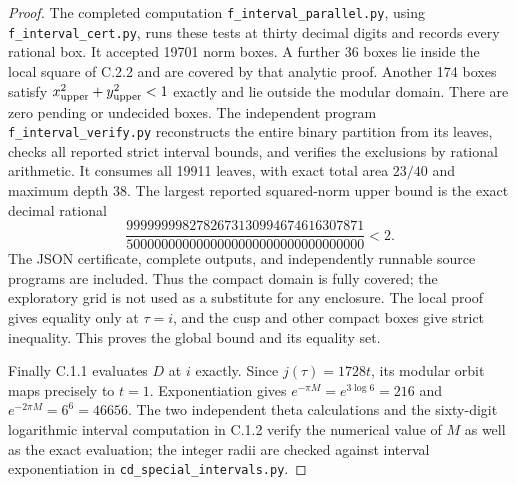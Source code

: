 \begin{proof}
The completed computation \texttt{f\_interval\_parallel.py}, using
\texttt{f\_interval\_cert.py}, runs these tests at thirty decimal digits
and records every rational box. It accepted 19701 norm boxes. A further
36 boxes lie inside the local square of C.2.2 and are covered by that
analytic proof. Another 174 boxes satisfy
$x_{\rm upper}^2+y_{\rm upper}^2<1$ exactly and lie outside the modular
domain. There are zero pending or undecided boxes. The independent
program \texttt{f\_interval\_verify.py} reconstructs the entire binary
partition from its leaves, checks all reported strict interval bounds,
and verifies the exclusions by rational arithmetic. It consumes all
19911 leaves, with exact total area $23/40$ and maximum depth 38.
The largest reported squared-norm upper bound is the exact decimal
rational
\[
 \frac{9999999982782673130994674616307871}
 {5000000000000000000000000000000000}<2.
\]
The JSON certificate, complete outputs, and independently runnable
source programs are included. Thus the compact domain is fully covered;
the exploratory grid is not used as a substitute for any enclosure.
The local proof gives equality only at $\tau=i$, and the cusp and other
compact boxes give strict inequality. This proves the global bound and
its equality set.

Finally C.1.1 evaluates $D$ at $i$ exactly. Since $j(\tau)=1728t$, its
modular orbit maps precisely to $t=1$. Exponentiation gives
$e^{-\pi M}=e^{3\log6}=216$ and $e^{-2\pi M}=6^6=46656$.
The two independent theta calculations and the sixty-digit logarithmic
interval computation in C.1.2 verify the numerical value of $M$ as well
as the exact evaluation; the integer radii are checked against interval
exponentiation in \texttt{cd\_special\_intervals.py}.
\end{proof}

